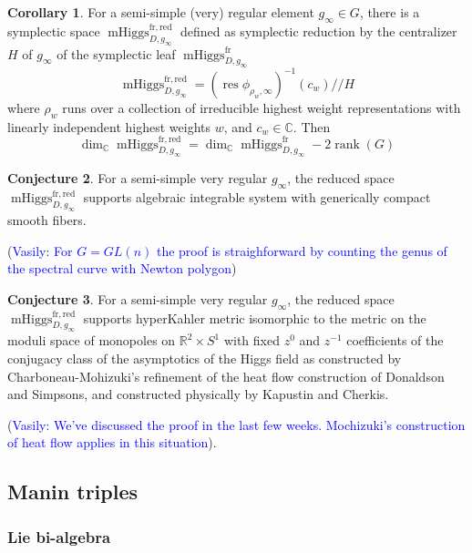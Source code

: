 \documentclass[11pt, oneside, reqno]{amsart}
\theoremstyle{definition} \newtheorem{definition}{Definition}[section]
\newtheorem{conjecture}[definition]{Conjecture}
\newtheorem{corollary}[definition]{Corollary}
\theoremstyle{definition} \newtheorem{remark}[definition]{Remark}
\theoremstyle{definition} \newtheorem{remarks}[definition]{Remarks}
\theoremstyle{definition} \newtheorem{question}[definition]{Question}
\theoremstyle{definition} \newtheorem*{note}{Note}
\theoremstyle{definition} \newtheorem{example}[definition]{Example}
\theoremstyle{definition} \newtheorem{examples}[definition]{Examples}
\DeclareMathOperator{\rank}{rank}
\DeclareMathOperator{\res}{res}
\DeclareMathOperator{\mhiggs}{mHiggs}
\newcommand{\fr}{\mathrm{fr}}
\newcommand{\vasily}[1]{(\textcolor{blue}{Vasily: #1})}
\begin{document}
\newcommand{\red}{\mathrm{red}}
\begin{corollary}
  For a semi-simple (very) regular element $g_\infty \in G$,
  there is a symplectic space $\mhiggs^{\fr, \red}_{D, g_\infty}$ defined as symplectic reduction
  by the centralizer $H$ of $g_\infty$ of the symplectic leaf $\mhiggs^{\fr}_{D, g_\infty}$
  \begin{equation}
 \mhiggs^{\fr, \red}_{D, g_\infty} = (\res \phi_{\rho_{w}, \infty} )^{-1} (c_{w}) // H
  \end{equation}
  where $\rho_{w}$ runs over a collection of irreducible
  highest weight representations with linearly independent highest weights $w$,
  and $c_{w} \in \mathbb{C}$. Then
  \begin{equation}
   \dim_{\mathbb{C}}  \mhiggs^{\fr, \red}_{D, g_\infty}  =    \dim_{\mathbb{C}}  \mhiggs^{\fr}_{D, g_\infty} - 2 \rank(G)
  \end{equation}
\end{corollary}
  
\begin{conjecture}
  For a semi-simple very regular $g_\infty$, the reduced space  $\mhiggs^{\fr, \red}_{D, g_\infty}$  supports  algebraic integrable system with generically compact smooth fibers.
\end{conjecture}
\vasily{For $G =GL(n)$ the proof is straighforward by counting the genus of the spectral curve
with Newton polygon}

\begin{conjecture}
  For a semi-simple very regular $g_\infty$, the reduced space  $\mhiggs^{\fr, \red}_{D, g_\infty}$
  supports hyperKahler metric isomorphic
  to the metric on the moduli space of monopoles on $\mathbb{R}^2 \times S^1$
  with fixed $z^{0}$ and $z^{-1}$ coefficients of the conjugacy class of the asymptotics
  of the Higgs field as constructed by Charboneau-Mohizuki's refinement of the heat flow
  construction of Donaldson and Simpsons, and constructed physically by Kapustin and Cherkis.
\end{conjecture}
\vasily{We've discussed the proof in the last few weeks. Mochizuki's construction of heat
  flow applies in this situation}. 


 


\subsection{Manin triples}

\subsubsection{Lie bi-algebra}
\end{document}
